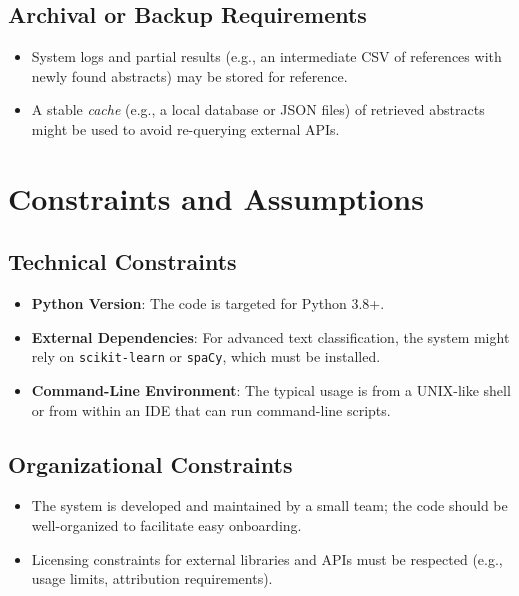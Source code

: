 \documentclass[12pt]{article}
\begin{document}
\subsection{Archival or Backup Requirements}
\begin{itemize}
  \item System logs and partial results (e.g., an intermediate CSV of references with newly found abstracts) may be stored for reference. 
  \item A stable \emph{cache} (e.g., a local database or JSON files) of retrieved abstracts might be used to avoid re-querying external APIs. 
\end{itemize}

\newpage

\section{Constraints and Assumptions}

\subsection{Technical Constraints}
\begin{itemize}
  \item \textbf{Python Version}: The code is targeted for Python 3.8+.
  \item \textbf{External Dependencies}: For advanced text classification, the system might rely on \texttt{scikit-learn} or \texttt{spaCy}, which must be installed. 
  \item \textbf{Command-Line Environment}: The typical usage is from a UNIX-like shell or from within an IDE that can run command-line scripts.
\end{itemize}

\subsection{Organizational Constraints}
\begin{itemize}
  \item The system is developed and maintained by a small team; the code should be well-organized to facilitate easy onboarding.
  \item Licensing constraints for external libraries and APIs must be respected (e.g., usage limits, attribution requirements).
\end{itemize}
\end{document}
